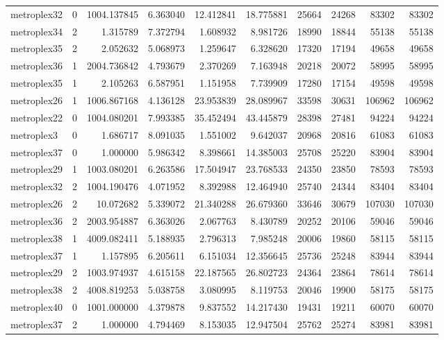 \begin{longtable}{|l|r|r|r|r|r|r|r|r|r|}
metroplex32 & 0 & 1004.137845 & 6.363040 & 12.412841 & 18.775881 & 25664 & 24268 & 83302 & 83302 \\
metroplex34 & 2 & 1.315789 & 7.372794 & 1.608932 & 8.981726 & 18990 & 18844 & 55138 & 55138 \\
metroplex35 & 2 & 2.052632 & 5.068973 & 1.259647 & 6.328620 & 17320 & 17194 & 49658 & 49658 \\
metroplex36 & 1 & 2004.736842 & 4.793679 & 2.370269 & 7.163948 & 20218 & 20072 & 58995 & 58995 \\
metroplex35 & 1 & 2.105263 & 6.587951 & 1.151958 & 7.739909 & 17280 & 17154 & 49598 & 49598 \\
metroplex26 & 1 & 1006.867168 & 4.136128 & 23.953839 & 28.089967 & 33598 & 30631 & 106962 & 106962 \\
metroplex22 & 0 & 1004.080201 & 7.993385 & 35.452494 & 43.445879 & 28398 & 27481 & 94224 & 94224 \\
metroplex3 & 0 & 1.686717 & 8.091035 & 1.551002 & 9.642037 & 20968 & 20816 & 61083 & 61083 \\
metroplex37 & 0 & 1.000000 & 5.986342 & 8.398661 & 14.385003 & 25708 & 25220 & 83904 & 83904 \\
metroplex29 & 1 & 1003.080201 & 6.263586 & 17.504947 & 23.768533 & 24350 & 23850 & 78593 & 78593 \\
metroplex32 & 2 & 1004.190476 & 4.071952 & 8.392988 & 12.464940 & 25740 & 24344 & 83404 & 83404 \\
metroplex26 & 2 & 10.072682 & 5.339072 & 21.340288 & 26.679360 & 33646 & 30679 & 107030 & 107030 \\
metroplex36 & 2 & 2003.954887 & 6.363026 & 2.067763 & 8.430789 & 20252 & 20106 & 59046 & 59046 \\
metroplex38 & 1 & 4009.082411 & 5.188935 & 2.796313 & 7.985248 & 20006 & 19860 & 58115 & 58115 \\
metroplex37 & 1 & 1.157895 & 6.205611 & 6.151034 & 12.356645 & 25736 & 25248 & 83944 & 83944 \\
metroplex29 & 2 & 1003.974937 & 4.615158 & 22.187565 & 26.802723 & 24364 & 23864 & 78614 & 78614 \\
metroplex38 & 2 & 4008.819253 & 5.038758 & 3.080995 & 8.119753 & 20046 & 19900 & 58175 & 58175 \\
metroplex40 & 0 & 1001.000000 & 4.379878 & 9.837552 & 14.217430 & 19431 & 19211 & 60070 & 60070 \\
metroplex37 & 2 & 1.000000 & 4.794469 & 8.153035 & 12.947504 & 25762 & 25274 & 83981 & 83981 \\

\end{longtable}
